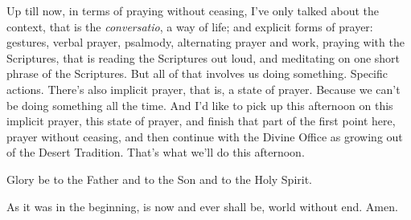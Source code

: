 Up till now, in terms of praying without ceasing, I've only talked about the context, that is the \emph{conversatio}, a way of life; and explicit forms of prayer: gestures, verbal prayer, psalmody, alternating prayer and work, praying with the Scriptures, that is reading the Scriptures out loud, and meditating on one short phrase of the Scriptures. But all of that involves us doing something. Specific actions. There's also implicit prayer, that is, a state of prayer. Because we can't be doing something all the time. And I'd like to pick up this afternoon on this implicit prayer, this state of prayer, and finish that part of the first point here, prayer without ceasing, and then continue with the Divine Office as growing out of the Desert Tradition. That's what we'll do this afternoon.

\smallskip

\begin{itshape}
\noindent Glory be to the Father and to the Son and to the Holy Spirit.

\noindent As it was in the beginning, is now and ever shall be, world without end. Amen.
\end{itshape}

